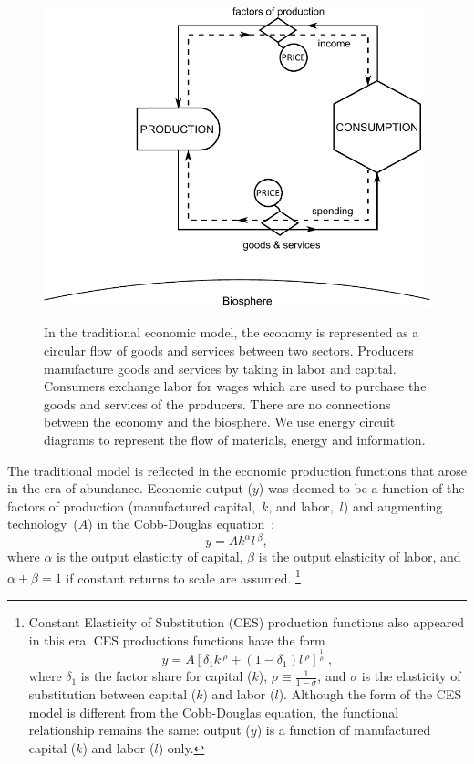 \begin{figure}[!ht]
\centering\
\includegraphics[width=\linewidth]{Part_0/Chapter_Acct_For_WoN/images/Perpetual_motion_1.pdf}
\caption[The traditional economic model]{In the traditional economic model, 
the economy is represented as a circular flow of goods and services between two sectors. 
Producers manufacture goods and services 
by taking in labor and capital. 
Consumers exchange labor for wages 
which are used to purchase 
the goods and services of the producers.
There are no connections between the economy and the biosphere.
We use energy circuit diagrams to represent the flow of 
materials, energy and information.\cite{Odum1996}}
\label{fig:perp_motion_1}
\end{figure}

The traditional model is reflected in the economic production functions
that arose in the era of abundance. 
Economic output ($y$) was deemed to be a function 
of the factors of production (manufactured capital,~$k$, and labor,~$l$)
and augmenting technology~($A$) in the Cobb-Douglas equation~\cite{Solow:1956wj}:
%
\begin{equation} \label{eq:cobb-douglas}
	y = A k^{\alpha} l \, ^\beta ,
\end{equation}	 
%
where $\alpha$ is the output elasticity of capital, $\beta$ is the output elasticity
of labor, and $\alpha + \beta = 1$ if constant returns to scale are assumed.%
	\footnote{
	Constant Elasticity of Substitution (CES) production functions also appeared 
	in this era.
	CES productions functions have the form
	\begin{equation*}
		y = A \left[ \delta_1 k \, ^\rho + (1-\delta_1) l \, ^\rho    \right]^{\frac{1}{\rho}} \; ,
	\end{equation*}
	where $\delta_1$ is the factor share for capital ($k$),
	$\rho \equiv \frac{1}{1-\sigma}$, and 
	$\sigma$ is the elasticity of substitution 
	between capital ($k$) and labor ($l$).\cite{Solow:1956wj}
	Although the form of the CES model is different from 
	the Cobb-Douglas equation, 
	the functional relationship remains the same: 
	output ($y$) is a function of manufactured capital ($k$) and labor ($l$) only.
	}

